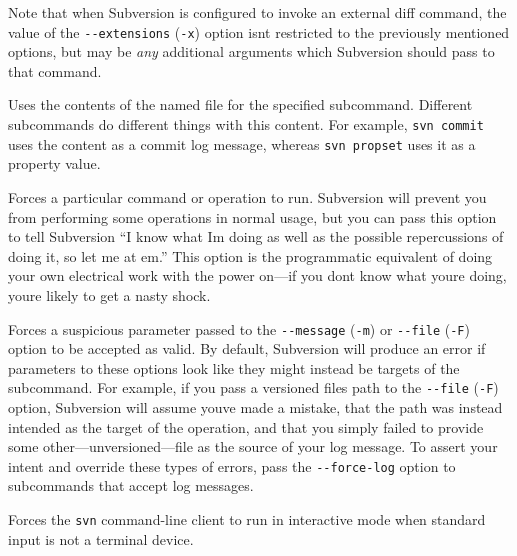 \begin{description}
Note that when Subversion is configured to invoke an external diff
command, the value of the \texttt{-\/-extensions} (\texttt{-x}) option
isn\textquotesingle t restricted to the previously mentioned options,
but may be \emph{any} additional arguments which Subversion should pass
to that command.
\item[\protect\phantomsection\label{svn.ref.svn.sw.file}{}\texttt{-\/-file}
(\texttt{-F}) \textless FILENAME\textgreater{}]
Uses the contents of the named file for the specified subcommand.
Different subcommands do different things with this content. For
example, \texttt{svn\ commit} uses the content as a commit log message,
whereas \texttt{svn\ propset} uses it as a property value.
\item[\protect\phantomsection\label{svn.ref.svn.sw.force}{}\texttt{-\/-force}]
Forces a particular command or operation to run. Subversion will prevent
you from performing some operations in normal usage, but you can pass
this option to tell Subversion ``I know what I\textquotesingle m doing
as well as the possible repercussions of doing it, so let me at
\textquotesingle em.'' This option is the programmatic equivalent of
doing your own electrical work with the power on---if you
don\textquotesingle t know what you\textquotesingle re doing,
you\textquotesingle re likely to get a nasty shock.
\item[\protect\phantomsection\label{svn.ref.svn.sw.force_log}{}\texttt{-\/-force-log}]
Forces a suspicious parameter passed to the \texttt{-\/-message}
(\texttt{-m}) or \texttt{-\/-file} (\texttt{-F}) option to be accepted
as valid. By default, Subversion will produce an error if parameters to
these options look like they might instead be targets of the subcommand.
For example, if you pass a versioned file\textquotesingle s path to the
\texttt{-\/-file} (\texttt{-F}) option, Subversion will assume
you\textquotesingle ve made a mistake, that the path was instead
intended as the target of the operation, and that you simply failed to
provide some other---unversioned---file as the source of your log
message. To assert your intent and override these types of errors, pass
the \texttt{-\/-force-log} option to subcommands that accept log
messages.
\item[\protect\phantomsection\label{svn.ref.svn.sw.force_interactive}{}\texttt{-\/-force-interactive}]
Forces the \texttt{svn} command-line client to run in interactive mode
when standard input is not a terminal device.


\end{description}
